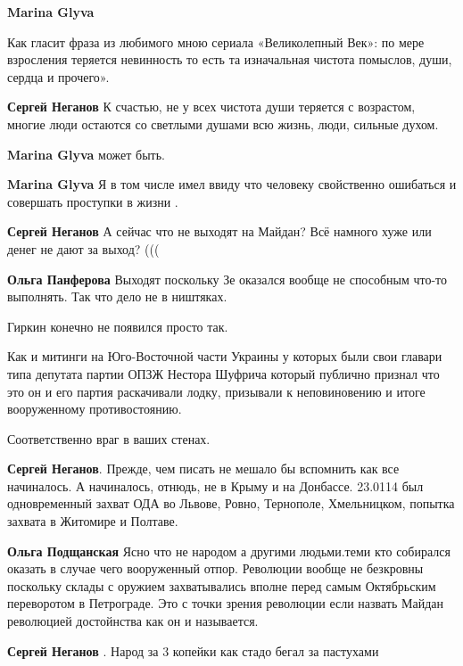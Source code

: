 \begin{itemize}
\begin{itemize}
\textbf{Marina Glyva} 

Как гласит фраза из любимого мною сериала «Великолепный Век»: по мере
взросления теряется невинность то есть та изначальная чистота
помыслов, души, сердца и прочего».

\textbf{Сергей Неганов} К счастью, не у всех чистота души теряется с возрастом, многие люди остаются со светлыми душами всю жизнь, люди, сильные духом.

\textbf{Marina Glyva} может быть.

\textbf{Marina Glyva} Я в том числе имел ввиду что человеку свойственно ошибаться и совершать проступки в жизни .

\textbf{Сергей Неганов} А сейчас что не выходят на Майдан? Всё намного хуже или денег не дают за выход? (((

\textbf{Ольга Панферова} Выходят поскольку Зе оказался вообще не способным что-то выполнять.
Так что дело не в ништяках.

\end{itemize} %


Гиркин конечно не появился просто так.

Как и митинги на Юго-Восточной части Украины у которых были свои главари типа
депутата партии ОПЗЖ Нестора Шуфрича который публично признал что это он и его
партия раскачивали лодку, призывали к неповиновению и итоге вооруженному
противостоянию.

Соответственно враг в ваших стенах.

\begin{itemize} %
\textbf{Сергей Неганов}. Прежде, чем писать не мешало бы вспомнить как все начиналось. А начиналось, отнюдь, не в Крыму и на Донбассе. 23.0114 был одновременный захват ОДА во Львове, Ровно, Тернополе, Хмельницком, попытка захвата в Житомире и Полтаве.

\textbf{Ольга Подщанская} Ясно что не народом а другими людьми.теми кто собирался оказать в случае чего вооруженный отпор.
Революции вообще не безкровны поскольку склады с оружием захватывались вполне перед самым Октябрьским переворотом в Петрограде.
Это с точки зрения революции если назвать Майдан революцией достойнства как он и называется.

\textbf{Сергей Неганов} . Народ за 3 копейки как стадо бегал за пастухами


\end{itemize}
\end{itemize}
